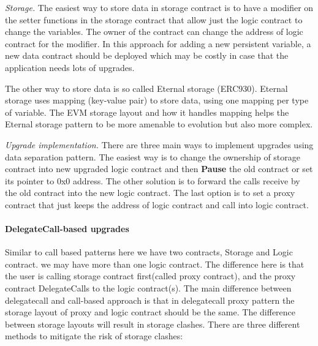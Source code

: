 \textit{Storage. } The easiest way to store data in storage contract is to have a modifier on the setter functions in the storage contract that allow just the logic contract to change the variables. The owner of the contract can change the address of logic contract for the modifier.
In this approach for adding a new persistent variable, a new data contract should be deployed which may be costly in case that the application needs lots of upgrades.

The other way to store data is so called Eternal storage (ERC930). Eternal storage uses mapping (key-value pair) to store data, using one mapping per type of variable. The EVM storage layout and how it handles mapping helps the Eternal storage pattern to be more amenable to evolution but also more complex.

\textit{Upgrade implementation. } There are three main ways to implement upgrades using data separation pattern. The easiest way is to change the ownership of storage contract into new upgraded logic contract and then \textbf{Pause} the old contract or set its pointer to 0x0 address. The other solution is to forward the calls receive by the old contract into the new logic contract. The last option is to set a proxy contract that just keeps the address of logic contract and call into logic contract.




\paragraph{DelegateCall-based upgrades}
Similar to call based patterns here we have two contracts, Storage and Logic contract. we may have more than one logic contract. The difference here is that the user is calling storage contract first(called proxy contract), and the proxy contract DelegateCalls to the logic contract(s).
The main difference between delegatecall and call-based approach is that in delegatecall proxy pattern the storage layout of proxy and logic contract should be the same. The difference between storage layouts will result in storage clashes. 
There are three different methods to mitigate the risk of storage clashes:

